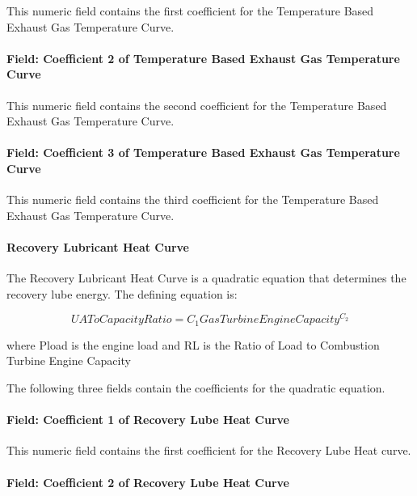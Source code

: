 This numeric field contains the first coefficient for the Temperature Based Exhaust Gas Temperature Curve.

\paragraph{Field: Coefficient 2 of Temperature Based Exhaust Gas Temperature Curve}\label{field-coefficient-2-of-temperature-based-exhaust-gas-temperature-curve}

This numeric field contains the second coefficient for the Temperature Based Exhaust Gas Temperature Curve.

\paragraph{Field: Coefficient 3 of Temperature Based Exhaust Gas Temperature Curve}\label{field-coefficient-3-of-temperature-based-exhaust-gas-temperature-curve}

This numeric field contains the third coefficient for the Temperature Based Exhaust Gas Temperature Curve.

\paragraph{Recovery Lubricant Heat Curve}\label{recovery-lubricant-heat-curve}

The Recovery Lubricant Heat Curve is a quadratic equation that determines the recovery lube energy. The defining equation is:

\begin{equation}
UAToCapacityRatio = {C_1}GasTurbineEngineCapacit{y^{{C_2}}}
\end{equation}

where Pload is the engine load and RL is the Ratio of Load to Combustion Turbine Engine Capacity

The following three fields contain the coefficients for the quadratic equation.

\paragraph{Field: Coefficient 1 of Recovery Lube Heat Curve}\label{field-coefficient-1-of-recovery-lube-heat-curve}

This numeric field contains the first coefficient for the Recovery Lube Heat curve.

\paragraph{Field: Coefficient 2 of Recovery Lube Heat Curve}\label{field-coefficient-2-of-recovery-lube-heat-curve}


